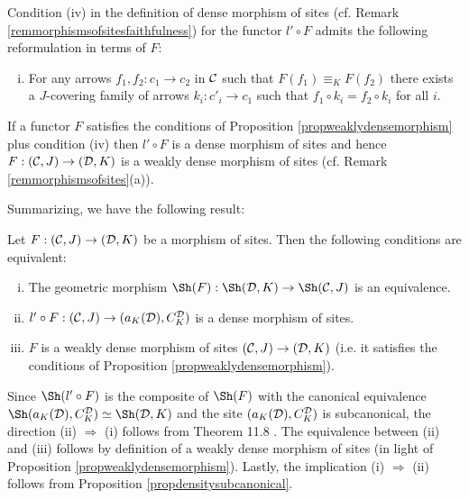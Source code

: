 \documentclass[a4paper,12pt]{article}
\begin{document}
	
\begin{remark}
		Condition (iv) in the definition of dense morphism of sites (cf. Remark \ref{remmorphismsofsitesfaithfulness}) for the functor $l'\circ F$ admits the following reformulation in terms of $F$:
		
		\begin{enumerate}[(i)]
			\item[(iv)] For any arrows $f_{1}, f_{2}:c_{1}\to c_{2}$ in $\cal C$ such that $F(f_1)\equiv_{K} F(f_2)$ there exists a $J$-covering family of arrows $k_{i}:c'_{i}\to c_{1}$ such that $f_1 \circ k_{i}=f_{2}\circ k_{i}$ for all $i$.
		\end{enumerate}
	
		If a functor $F$ satisfies the conditions of Proposition \ref{propweaklydensemorphism} plus condition (iv) then $l'\circ F$ is a dense morphism of sites and hence $F:({\cal C}, J)\to ({\cal D}, K)$ is a weakly dense morphism of sites (cf. Remark \ref{remmorphismsofsites}(a)).  	
\end{remark}	

Summarizing, we have the following result:
\begin{theorem}\label{thmweakdensityequivalence}
	Let $F:({\cal C}, J)\to ({\cal D}, K)$ be a morphism of sites. Then the following conditions are equivalent:
	\begin{enumerate}[(i)]
		\item The geometric morphism $\Sh(F):\Sh({\cal D}, K)\to \Sh({\cal C}, J)$ is an equivalence.
		
		\item $l'\circ F:({\cal C}, J)\to (a_{K}({\cal D}), C_{K}^{\cal D})$ is a dense morphism of sites.
		
		\item $F$ is a weakly dense morphism of sites $({\cal C}, J)\to ({\cal D}, K)$ (i.e. it satisfies the conditions of Proposition \ref{propweaklydensemorphism}).
	\end{enumerate}
\end{theorem}

\begin{proofs}
Since $\Sh(l'\circ F)$ is the composite of $\Sh(F)$ with the canonical equivalence $\Sh(a_{K}({\cal D}), C_{K}^{\cal D})\simeq \Sh({\cal D}, K)$ and the site $(a_{K}({\cal D}), C_{K}^{\cal D})$ is subcanonical, the direction (ii) $\Rightarrow$ (i) follows from Theorem 11.8 \cite{Shulman}. The equivalence between (ii) and (iii) follows by definition of a  weakly dense morphism of sites (in light of Proposition \ref{propweaklydensemorphism}). Lastly, the implication (i) $\Rightarrow$ (ii) follows from Proposition \ref{propdensitysubcanonical}. 	
\end{proofs}
\end{document}
